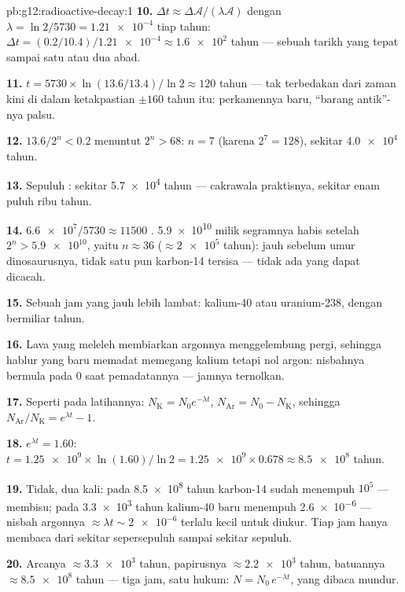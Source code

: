 \begin{solution}{pb:g12:radioactive-decay:1}
\textbf{10.} $\Delta t \approx \Delta\mathcal A/(\lambda\mathcal A)$
dengan $\lambda = \ln 2/5730 = \num{1.21e-4}$ tiap tahun:
$\Delta t = (0.2/10.4)/\num{1.21e-4} \approx \num{1.6e2}$ tahun ---
sebuah tarikh yang tepat sampai satu atau dua abad.

\textbf{11.} $t = \num{5730} \times \ln(13.6/13.4)/\ln 2 \approx
120$ tahun --- tak terbedakan dari zaman kini di dalam ketakpastian
$\pm 160$ tahun itu: perkamennya baru, ``barang antik''-nya palsu.

\textbf{12.} $13.6/2^n < 0.2$ menuntut $2^n > 68$: $n = 7$ 
(karena $2^7 = 128$), sekitar $\num{4.0e4}$ tahun.

\textbf{13.} Sepuluh : sekitar \num{5.7e4} tahun --- cakrawala
praktisnya, sekitar enam puluh ribu tahun.

\textbf{14.} $\num{6.6e7}/\num{5730} \approx \num{11500}$ .
\num{5.9e10}  milik segramnya habis setelah
$2^n > \num{5.9e10}$, yaitu $n \approx 36$ 
($\approx \num{2e5}$ tahun): jauh sebelum umur dinosaurusnya, tidak satu pun
 karbon-14 tersisa --- tidak ada yang dapat dicacah.

\textbf{15.} Sebuah jam yang jauh lebih lambat: kalium-40 atau uranium-238, dengan
 bermiliar tahun.

\textbf{16.} Lava yang meleleh membiarkan argonnya menggelembung pergi, sehingga hablur yang
baru memadat memegang kalium tetapi nol argon: nisbahnya bermula
pada $0$ saat pemadatannya --- jamnya ternolkan.

\textbf{17.} Seperti pada latihannya: $N_{\mathrm K} = N_0 e^{-\lambda t}$,
$N_{\mathrm{Ar}} = N_0 - N_{\mathrm K}$, sehingga
$N_{\mathrm{Ar}}/N_{\mathrm K} = e^{\lambda t} - 1$.

\textbf{18.} $e^{\lambda t} = 1.60$:
$t = \num{1.25e9} \times \ln(1.60)/\ln 2 = \num{1.25e9} \times 0.678
\approx \num{8.5e8}$ tahun.

\textbf{19.} Tidak, dua kali: pada \num{8.5e8} tahun karbon-14 sudah menempuh
$10^5$  --- membisu; pada \num{3.3e3} tahun kalium-40 baru
menempuh \num{2.6e-6}  --- nisbah argonnya
$\approx \lambda t \sim \num{2e-6}$ terlalu kecil untuk diukur. Tiap
jam hanya membaca dari sekitar sepersepuluh  sampai sekitar sepuluh.

\textbf{20.} Arcanya $\approx \num{3.3e3}$ tahun, papirusnya
$\approx \num{2.2e3}$ tahun, batuannya $\approx \num{8.5e8}$ tahun ---
tiga jam, satu hukum: $N = N_0\,e^{-\lambda t}$, yang dibaca mundur.
\end{solution}
